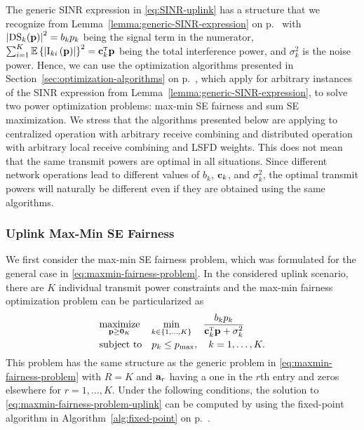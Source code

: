 The generic SINR expression in \eqref{eq:SINR-uplink} has a structure that we recognize from Lemma~\ref{lemma:generic-SINR-expression} on p.~\pageref{lemma:generic-SINR-expression} with $\left|\mathrm{DS}_k(\mathbf{p})\right|^2 = b_kp_k$ being the signal term in the numerator, $\sum_{i=1}^K\mathbb{E}\left\{\left|\mathrm{I}_{ki}\left(\vect{p}\right)\right|\right\}^2 = \vect{c}_k^{\Ttran}\vect{p}$ being the total interference power, and $\sigma_k^2$ is the noise power. 
Hence, we can use the optimization algorithms presented in Section~\ref{sec:optimization-algorithms} on p.~\pageref{sec:optimization-algorithms}, which apply for arbitrary instances of the SINR expression from Lemma~\ref{lemma:generic-SINR-expression}, 
to solve two power optimization problems: max-min SE fairness and sum SE maximization. We stress that the algorithms presented below are applying to centralized operation with arbitrary receive combining and distributed operation with arbitrary local receive combining and LSFD weights. This does not mean that the same transmit powers are optimal in all situations. Since different network operations lead to different values of $b_k$, $\mathbf{c}_k$, and $\sigma_k^2$, the optimal transmit powers will naturally be different even if they are obtained using the same algorithms.


\subsubsection{Uplink Max-Min SE Fairness}

We first consider the max-min SE fairness problem, which was formulated for the general case in \eqref{eq:maxmin-fairness-problem}. In the considered uplink scenario, there are $K$ individual transmit power constraints and the max-min fairness optimization problem can be particularized as
\begin{align} \label{eq:maxmin-fairness-problem-uplink}
&\underset{\vect{p} \geq \vect{0}_K}{\textrm{maximize}} \quad \min\limits_{k\in \{1,\ldots,K\}} \quad \frac{b_kp_k}{\vect{c}_k^{\Ttran}\vect{p}+\sigma_k^2} \\
&\textrm{subject to} \quad p_k\leq \pmax, \quad k=1,\ldots,K.  \nonumber
\end{align}
This problem has the same structure as the generic problem in \eqref{eq:maxmin-fairness-problem} with $R=K$ and $\mathbf{a}_r$ 
having a one in the $r$th entry and zeros elsewhere for $r=1,\ldots,K$. Under the following conditions, the solution to \eqref{eq:maxmin-fairness-problem-uplink} can be computed by using the fixed-point algorithm in Algorithm~\ref{alg:fixed-point} on p.~\pageref{alg:fixed-point}.

